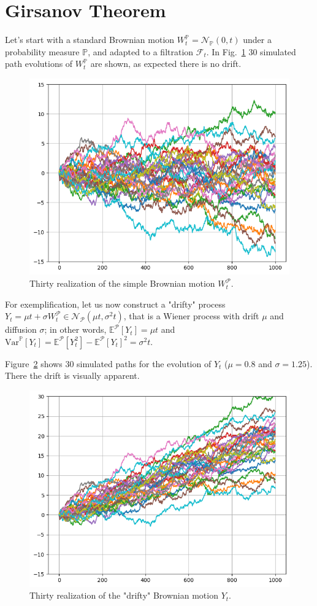 \documentclass[12pt,a4paper]{book}
\begin{document}
\section{Girsanov Theorem}
\begin{exercise}[subtitle=Drifty Brownian Motion]
Let’s start with a standard Brownian motion $W_t^{\mathbb{P}} = \mathcal{N}_{\mathbb{P}}(0,t)$ under a probability measure $\mathbb{P}$, and adapted to a filtration $\mathcal{F}_t$. In Fig.~\ref{fig:brownian_motion_nodrift} 30 simulated path evolutions of $W_t^{\mathbb{P}}$ are shown, as expected there is no drift.
	
\begin{figure}[htbp]
	\begin{center}
		\includegraphics[width=0.5\linewidth]{addons/brownian_motion_nodrift}
	\end{center}
	\label{fig:brownian_motion_nodrift}
	\caption{Thirty realization of the simple Brownian motion $W_t^{\mathcal{P}}$.}
\end{figure}

For exemplification, let us now construct a "drifty" process $Y_t=\mu t+\sigma W_t^{\mathcal{P}}\in \mathcal{N}_{\mathcal{P}}(\mu t, \sigma^2 t)$, that is a Wiener process with drift $\mu$ and diffusion $\sigma$; in other words, $\mathbb{E}^{\mathcal{P}}[Y_t]=\mu t$ and $\text{Var}^{\mathbb{P}}[Y_t]=\mathbb{E}^{\mathcal{P}}[Y^2_t]-\mathbb{E}^{\mathcal{P}}[Y_t]^2=\sigma^2 t$.

Figure~\ref{fig:brownian_motion_drift} shows 30 simulated paths for the evolution of $Y_t$ ($\mu = 0.8$ and $\sigma =1.25$). There the drift is visually apparent.
\begin{figure}[htbp]
\begin{center}
	\includegraphics[width=0.5\linewidth]{addons/brownian_motion_drift}
\end{center}
\label{fig:brownian_motion_drift}
	\caption{Thirty realization of the "drifty" Brownian motion $Y_t$.}
\end{figure}


\end{exercise}
\end{document}
